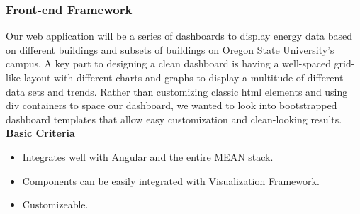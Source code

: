 \subsubsection{Front-end Framework}
Our web application will be a series of dashboards to display energy data based on different buildings and subsets of buildings on Oregon State University's campus. A key part to designing a clean dashboard is having a well-spaced grid-like layout with different charts and graphs to display a multitude of different data sets and trends. Rather than customizing classic html elements and using div containers to space our dashboard, we wanted to look into bootstrapped dashboard templates that allow easy customization and clean-looking results.\\ 
\textbf{Basic Criteria}
\begin{itemize}
\item Integrates well with Angular and the entire MEAN stack. 
\item Components can be easily integrated with Visualization Framework. 
\item Customizeable.
\end{itemize}
